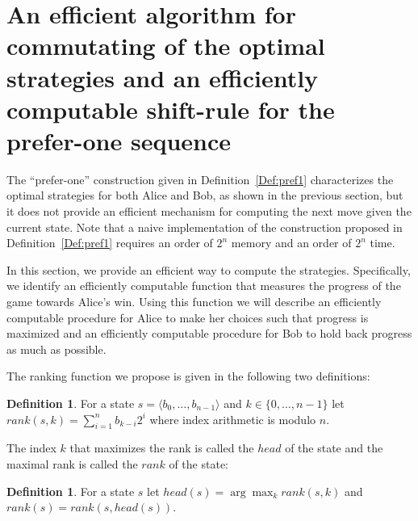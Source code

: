 \documentclass[final,12pt]{elsarticle}
\theoremstyle{definition} \newtheorem{definition}[theorem]{Definition} \newtheorem{observation}[theorem]{Observation} \newtheorem{example}[theorem]{Example} \newtheorem{remark}[theorem]{Remark} \newtheorem{corrolary}[theorem]{Corrolary}
\newcommand{\REF}[2]{#1~\ref{#2}}
\newcommand{\T}[1]{\langle{#1}\rangle} \DeclareMathOperator{\drop}{drop} \DeclareMathOperator{\dropbits}{drop\_bits} \DeclareMathOperator{\dropstates}{drop\_states} \DeclareMathOperator{\leadingForm}{LeadingForm} \DeclareMathOperator{\dv}{div} %
\begin{document}
\section{An efficient algorithm for commutating of the optimal strategies and an efficiently computable shift-rule for the prefer-one sequence}
\label{sec:efficient-optimal}

The ``prefer-one'' construction given in \REF{Definition}{Def:pref1} characterizes the optimal strategies for both Alice and Bob, as shown in the previous section, but it does not provide an efficient mechanism for computing the next move given the current state. Note that a naive implementation of the construction proposed in \REF{Definition}{Def:pref1} requires an order of $2^n$ memory and an order of $2^n$ time. 

In this section, we provide an efficient way to compute the strategies. Specifically, we identify an efficiently computable function that measures the progress of the game towards Alice's win. Using this function we will describe an efficiently computable procedure for Alice to make her choices such that progress is maximized and an efficiently computable procedure for Bob to hold back progress as much as possible.

The ranking function we propose is given in the following two definitions:

\begin{definition}
	For a state $s=\T{b_0,\dots,b_{n-1}}$ and $k \in \{0,\dots,n-1\}$ let  $rank(s,k)=\sum_{i=1}^{n}  b_{k-i} 2^i$ where index arithmetic is modulo $n$.
\end{definition}
The index $k$ that maximizes the rank is called the $head$ of the state and the maximal rank is called the $rank$ of the state:
\begin{definition}
	For a state $s$ let  $head(s)=\arg \max_k rank(s,k)$ and $rank(s)=rank(s,head(s))$.
\end{definition}
\end{document}
